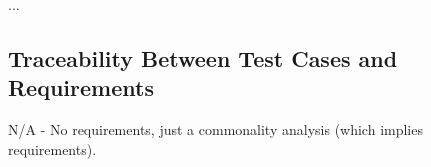 \documentclass[12pt, titlepage]{article}
\begin{document}
%
...

\subsection{Traceability Between Test Cases and Requirements}

N/A - No requirements, just a commonality analysis (which implies requirements).


		



					
					
					
					
					

					
					
					
					


\end{document}
